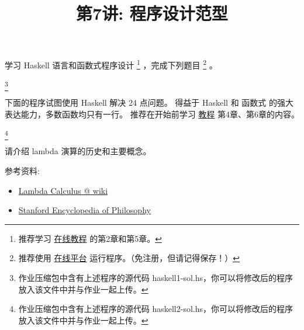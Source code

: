 \documentclass[a4paper, justified]{tufte-handout}
\title{第7讲: 程序设计范型}
\date{\zhtoday} %
\begin{document}
\maketitle
\noplagiarism %
\begin{abstract}
  \begin{center}{}
  \end{center}
\end{abstract}
\beginrequired

\begin{problem}
学习 Haskell 语言和函数式程序设计
\footnote{推荐学习 \href{https://learnyouahaskell.mno2.org/zh-cn}{在线教程} 的第2章和第5章。}
，完成下列题目
\footnote{推荐使用 \href{https://replit.com/languages/haskell}{在线平台} 运行程序。（免注册，但请记得保存！）}
。
\end{problem}
\begin{solution}
  \footnote{作业压缩包中含有上述程序的源代码 haskell1-sol.hs，你可以将修改后的程序放入该文件中并与作业一起上传。}

  
\end{solution}

\beginoptional
\begin{problem}[24 点]
下面的程序试图使用 Haskell 解决 24 点问题。
得益于 Haskell 和 函数式 的强大表达能力，多数函数均只有一行。
推荐在开始前学习 \href{https://learnyouahaskell.mno2.org/zh-cn}{教程} 第4章、第6章的内容。
\end{problem}
\begin{solution}
  \footnote{作业压缩包中含有上述程序的源代码 haskell2-sol.hs，你可以将修改后的程序放入该文件中并与作业一起上传。}

  
\end{solution}

\beginot

\begin{ot}
  请介绍 lambda 演算的历史和主要概念。

  \noindent 参考资料:
  \begin{itemize}
    \item \href{https://en.wikipedia.org/wiki/Lambda\_calculus}{Lambda Calculus @ wiki}
    \item \href{https://plato.stanford.edu/entries/lambda-calculus/}{Stanford Encyclopedia of Philosophy}
  \end{itemize}
\end{ot}
\end{document}
